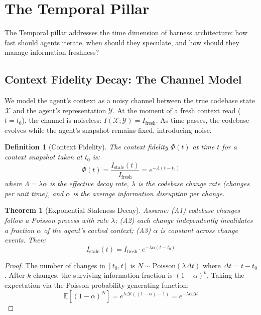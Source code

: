 \documentclass[11pt, a4paper]{googledeepmind}
\newtheorem{definition}{Definition}[section]
\newtheorem{theorem}{Theorem}[section]
\begin{document}
\section{The Temporal Pillar}
\label{sec:temporal}

The Temporal pillar addresses the time dimension of harness architecture: how fast should agents iterate, when should they speculate, and how should they manage information freshness?

\subsection{Context Fidelity Decay: The Channel Model}

We model the agent's context as a noisy channel between the true codebase state $\mathcal{X}$ and the agent's representation $\mathcal{Y}$. At the moment of a fresh context read ($t = t_0$), the channel is noiseless: $I(\mathcal{X}; \mathcal{Y}) = I_{\mathrm{fresh}}$. As time passes, the codebase evolves while the agent's snapshot remains fixed, introducing noise.

\begin{definition}[Context Fidelity]
\label{def:fidelity}
The context fidelity $\Phi(t)$ at time $t$ for a context snapshot taken at $t_0$ is:
\begin{equation}
    \Phi(t) = \frac{I_{\mathrm{stale}}(t)}{I_{\mathrm{fresh}}} = e^{-\Lambda(t - t_0)}
\end{equation}
where $\Lambda = \lambda \alpha$ is the effective decay rate, $\lambda$ is the codebase change rate (changes per unit time), and $\alpha$ is the average information disruption per change.
\end{definition}

\begin{theorem}[Exponential Staleness Decay]
\label{thm:staleness}
Assume: (A1) codebase changes follow a Poisson process with rate $\lambda$; (A2) each change independently invalidates a fraction $\alpha$ of the agent's cached context; (A3) $\alpha$ is constant across change events. Then:
\begin{equation}
    I_{\mathrm{stale}}(t) = I_{\mathrm{fresh}} \cdot e^{-\lambda\alpha(t - t_0)}
\end{equation}
\end{theorem}

\begin{proof}
The number of changes in $[t_0, t]$ is $N \sim \mathrm{Poisson}(\lambda\Delta t)$ where $\Delta t = t - t_0$. After $k$ changes, the surviving information fraction is $(1-\alpha)^k$. Taking the expectation via the Poisson probability generating function:
\begin{equation}
    \mathbb{E}[(1-\alpha)^N] = e^{\lambda\Delta t((1-\alpha) - 1)} = e^{-\lambda\alpha\Delta t}
\end{equation}
\end{proof}
\end{document}
